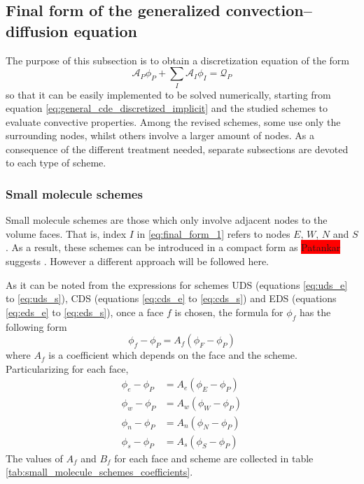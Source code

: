 
\subsection{Final form of the generalized convection--diffusion equation}

The purpose of this subsection is to obtain a discretization equation of the form
\begin{equation} \label{eq:final_form_1}
	\mathcal{A}_P \phi_P + \sum_I \mathcal{A}_I \phi_I = \mathcal{Q}_P
\end{equation}
so that it can be easily implemented to be solved numerically, starting from equation \eqref{eq:general_cde_discretized_implicit} and the studied schemes to evaluate convective properties. Among the revised schemes, some use only the surrounding nodes, whilst others involve a larger amount of nodes. As a consequence of the different treatment needed, separate subsections are devoted to each type of scheme.

\subsubsection{Small molecule schemes}

Small molecule schemes are those which only involve adjacent nodes to the volume faces. That is, index $I$ in \eqref{eq:final_form_1} refers to nodes $E$, $W$, $N$ and $S$. As a result, these schemes can be introduced in a compact form as \colorbox{red}{Patankar} suggests \cite{patankar2008numerical}. However a different approach will be followed here. 

As it can be noted from the expressions for schemes UDS (equations \eqref{eq:uds_e} to \eqref{eq:uds_s}), CDS (equations \eqref{eq:cds_e} to \eqref{eq:cds_s}) and EDS (equations \eqref{eq:eds_e} to \eqref{eq:eds_s}), once a face $f$ is chosen, the formula for $\phi_f$ has the following form
\begin{equation} \label{eq:small_molecule_schemes_1}
	\phi_f - \phi_P = A_f (\phi_F - \phi_P)
\end{equation}
where $A_f$ is a coefficient which depends on the face and the scheme. Particularizing for each face,
\begin{align}	
	\phi_e - \phi_P &= A_e (\phi_E - \phi_P) \label{eq:small_molecule_schemes_2} \\ 
	\phi_w - \phi_P &= A_w (\phi_W - \phi_P) \\
	\phi_n - \phi_P &= A_n (\phi_N - \phi_P) \\
	\phi_s - \phi_P &= A_s (\phi_S - \phi_P) \label{eq:small_molecule_schemes_3} 
\end{align}
The values of $A_f$ and $B_f$ for each face and scheme are collected in table \ref{tab:small_molecule_schemes_coefficients}.

